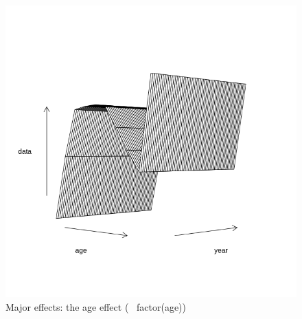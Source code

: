 \documentclass[a4paper,english,10pt]{article}\usepackage[]{graphicx}\usepackage[]{color}
\newenvironment{knitrout}{}{} %
\begin{document}
\begin{knitrout}
\color{fgcolor}\begin{figure}[H]

{\centering \includegraphics[width=.9\linewidth]{figure/majeffa-1} 

}

\caption[Major effects]{Major effects: the age effect (~ factor(age))}\label{fig:majeffa}
\end{figure}


\end{knitrout}
\end{document}
